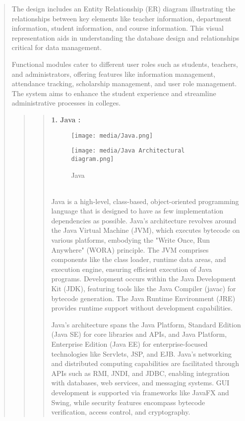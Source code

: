 \documentclass[12pt]{report}
\begin{document}
\begin{quote}
	The design includes an Entity Relationship (ER) diagram illustrating the relationships between key elements like teacher information, department information, student information, and course information. This visual representation aids in understanding the database design and relationships critical for data management.
	
	Functional modules cater to different user roles such as students, teachers, and administrators, offering features like information management, attendance tracking, scholarship management, and user role management. The system aims to enhance the student experience and streamline administrative processes in colleges.
		\clearpage
	
	\begin{quote}
		
		\begin{quote}
			\textbf{1. Java :}
			\begin{figure}[h]
				\centering
				\texttt{[image: media/Java.png]}\\
				\caption{Java}
				
				\!
				\!
				
				\texttt{[image: media/Java Architectural diagram.png]}\\
				
			\end{figure}
			\\Java is a high-level, class-based, object-oriented programming language that is designed to have as few implementation dependencies as possible.
			Java's architecture revolves around the Java Virtual Machine (JVM), which executes bytecode on various platforms, embodying the "Write Once, Run Anywhere" (WORA) principle. The JVM comprises components like the class loader, runtime data areas, and execution engine, ensuring efficient execution of Java programs. Development occurs within the Java Development Kit (JDK), featuring tools like the Java Compiler (javac) for bytecode generation. The Java Runtime Environment (JRE) provides runtime support without development capabilities.
			
			Java's architecture spans the Java Platform, Standard Edition (Java SE) for core libraries and APIs, and Java Platform, Enterprise Edition (Java EE) for enterprise-focused technologies like Servlets, JSP, and EJB. Java's networking and distributed computing capabilities are facilitated through APIs such as RMI, JNDI, and JDBC, enabling integration with databases, web services, and messaging systems. GUI development is supported via frameworks like JavaFX and Swing, while security features encompass bytecode verification, access control, and cryptography.
			

\end{quote}
\end{quote}
\end{quote}
\end{document}
